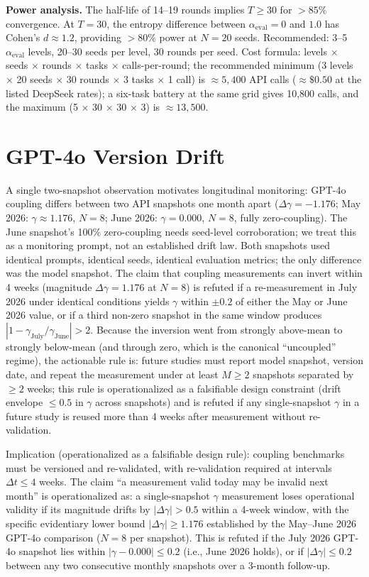 \documentclass[11pt]{article}
\begin{document}
\textbf{Power analysis.} The half-life of 14--19 rounds implies $T \geq 30$ for $>85\%$ convergence. At $T{=}30$, the entropy difference between $\alpha_{\text{eval}} = 0$ and $1.0$ has Cohen's $d \approx 1.2$, providing $>80\%$ power at $N{=}20$ seeds. Recommended: 3--5 $\alpha_{\text{eval}}$ levels, 20--30 seeds per level, 30 rounds per seed. Cost formula: levels $\times$ seeds $\times$ rounds $\times$ tasks $\times$ calls-per-round; the recommended minimum (3 levels $\times$ 20 seeds $\times$ 30 rounds $\times$ 3 tasks $\times$ 1 call) is $\approx 5{,}400$ API calls ($\approx \$0.50$ at the listed DeepSeek rates); a six-task battery at the same grid gives 10,800 calls, and the maximum (5 $\times$ 30 $\times$ 30 $\times$ 3) is $\approx 13{,}500$.

\section{GPT-4o Version Drift}

A single two-snapshot observation motivates longitudinal monitoring: GPT-4o coupling differs between two API snapshots one month apart ($\Delta\gamma = -1.176$; May 2026: $\gamma \approx 1.176$, $N{=}8$; June 2026: $\gamma = 0.000$, $N{=}8$, fully zero-coupling). The June snapshot's 100\% zero-coupling needs seed-level corroboration; we treat this as a monitoring prompt, not an established drift law. Both snapshots used identical prompts, identical seeds, identical evaluation metrics; the only difference was the model snapshot. The claim that coupling measurements can invert within 4 weeks (magnitude $\Delta\gamma = 1.176$ at $N{=}8$) is refuted if a re-measurement in July 2026 under identical conditions yields $\gamma$ within $\pm 0.2$ of either the May or June 2026 value, or if a third non-zero snapshot in the same window produces $|1 - \gamma_{\text{July}}/\gamma_{\text{June}}| > 2$. Because the inversion went from strongly above-mean to strongly below-mean (and through zero, which is the canonical ``uncoupled'' regime), the actionable rule is: future studies must report model snapshot, version date, and repeat the measurement under at least $M \geq 2$ snapshots separated by $\geq 2$ weeks; this rule is operationalized as a falsifiable design constraint (drift envelope $\leq 0.5$ in $\gamma$ across snapshots) and is refuted if any single-snapshot $\gamma$ in a future study is reused more than 4 weeks after measurement without re-validation.

Implication (operationalized as a falsifiable design rule): coupling benchmarks must be versioned and re-validated, with re-validation required at intervals $\Delta t \leq 4$ weeks. The claim ``a measurement valid today may be invalid next month'' is operationalized as: a single-snapshot $\gamma$ measurement loses operational validity if its magnitude drifts by $|\Delta\gamma| > 0.5$ within a 4-week window, with the specific evidentiary lower bound $|\Delta\gamma| \geq 1.176$ established by the May--June 2026 GPT-4o comparison ($N{=}8$ per snapshot). This is refuted if the July 2026 GPT-4o snapshot lies within $|\gamma - 0.000| \leq 0.2$ (i.e., June 2026 holds), or if $|\Delta\gamma| \leq 0.2$ between any two consecutive monthly snapshots over a 3-month follow-up.
\end{document}

